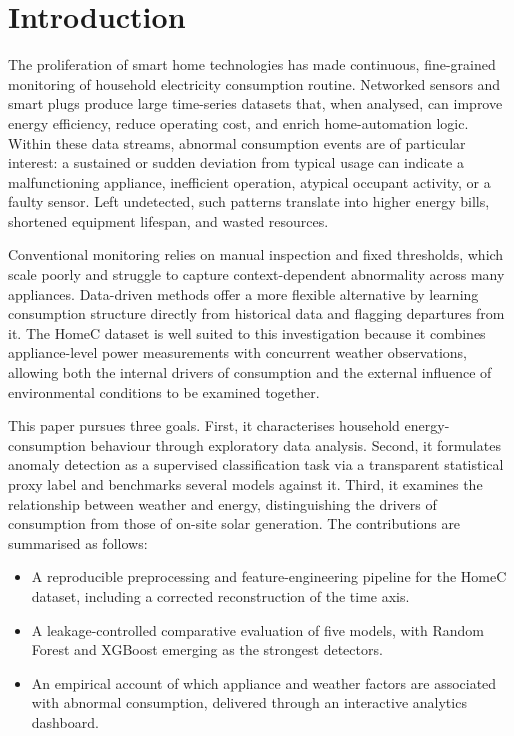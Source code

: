 \documentclass[pdflatex,sn-mathphys-num]{sn-jnl}%
\theoremstyle{thmstyleone}%
\theoremstyle{thmstyletwo}%
\theoremstyle{thmstylethree}%
\begin{document}
\maketitle

\section{Introduction}\label{sec:intro}

The proliferation of smart home technologies has made continuous, fine-grained monitoring of household electricity consumption routine. Networked sensors and smart plugs produce large time-series datasets that, when analysed, can improve energy efficiency, reduce operating cost, and enrich home-automation logic. Within these data streams, abnormal consumption events are of particular interest: a sustained or sudden deviation from typical usage can indicate a malfunctioning appliance, inefficient operation, atypical occupant activity, or a faulty sensor. Left undetected, such patterns translate into higher energy bills, shortened equipment lifespan, and wasted resources.

Conventional monitoring relies on manual inspection and fixed thresholds, which scale poorly and struggle to capture context-dependent abnormality across many appliances. Data-driven methods offer a more flexible alternative by learning consumption structure directly from historical data and flagging departures from it. The HomeC dataset is well suited to this investigation because it combines appliance-level power measurements with concurrent weather observations, allowing both the internal drivers of consumption and the external influence of environmental conditions to be examined together.

This paper pursues three goals. First, it characterises household energy-consumption behaviour through exploratory data analysis. Second, it formulates anomaly detection as a supervised classification task via a transparent statistical proxy label and benchmarks several models against it. Third, it examines the relationship between weather and energy, distinguishing the drivers of consumption from those of on-site solar generation. The contributions are summarised as follows:

\begin{itemize}
\item A reproducible preprocessing and feature-engineering pipeline for the HomeC dataset, including a corrected reconstruction of the time axis.
\item A leakage-controlled comparative evaluation of five models, with Random Forest and XGBoost emerging as the strongest detectors.
\item An empirical account of which appliance and weather factors are associated with abnormal consumption, delivered through an interactive analytics dashboard.
\end{itemize}
\end{document}
